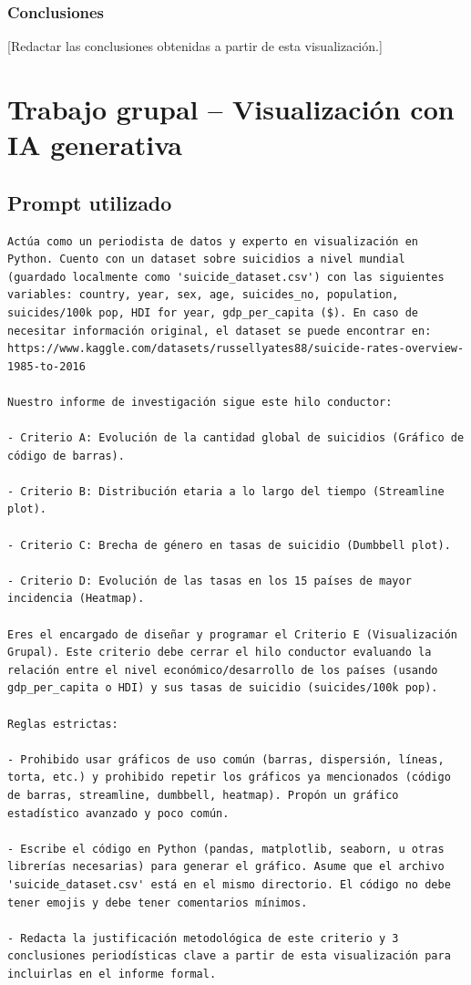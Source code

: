 \documentclass[12pt, letterpaper]{article}
\begin{document}
\subsubsection*{Conclusiones}

[Redactar las conclusiones obtenidas a partir de esta visualización.]

\section{Trabajo grupal -- Visualización con IA generativa}

\subsection{Prompt utilizado}

\begin{lstlisting}[basicstyle=\small\ttfamily, breaklines=true, frame=single, mathescape=false]
Actúa como un periodista de datos y experto en visualización en Python. Cuento con un dataset sobre suicidios a nivel mundial (guardado localmente como 'suicide_dataset.csv') con las siguientes variables: country, year, sex, age, suicides_no, population, suicides/100k pop, HDI for year, gdp_per_capita ($). En caso de necesitar información original, el dataset se puede encontrar en: https://www.kaggle.com/datasets/russellyates88/suicide-rates-overview-1985-to-2016

Nuestro informe de investigación sigue este hilo conductor:

- Criterio A: Evolución de la cantidad global de suicidios (Gráfico de código de barras).

- Criterio B: Distribución etaria a lo largo del tiempo (Streamline plot).

- Criterio C: Brecha de género en tasas de suicidio (Dumbbell plot).

- Criterio D: Evolución de las tasas en los 15 países de mayor incidencia (Heatmap).

Eres el encargado de diseñar y programar el Criterio E (Visualización Grupal). Este criterio debe cerrar el hilo conductor evaluando la relación entre el nivel económico/desarrollo de los países (usando gdp_per_capita o HDI) y sus tasas de suicidio (suicides/100k pop).

Reglas estrictas:

- Prohibido usar gráficos de uso común (barras, dispersión, líneas, torta, etc.) y prohibido repetir los gráficos ya mencionados (código de barras, streamline, dumbbell, heatmap). Propón un gráfico estadístico avanzado y poco común.

- Escribe el código en Python (pandas, matplotlib, seaborn, u otras librerías necesarias) para generar el gráfico. Asume que el archivo 'suicide_dataset.csv' está en el mismo directorio. El código no debe tener emojis y debe tener comentarios mínimos.

- Redacta la justificación metodológica de este criterio y 3 conclusiones periodísticas clave a partir de esta visualización para incluirlas en el informe formal.
\end{lstlisting}
\end{document}
